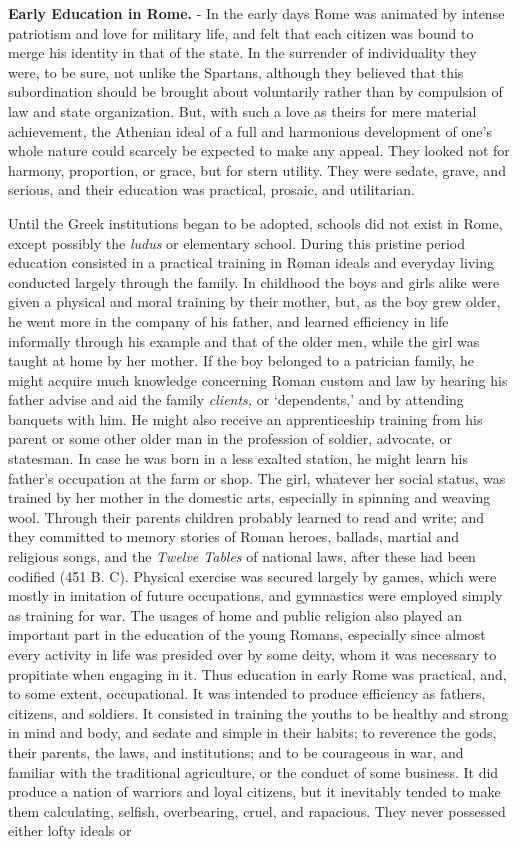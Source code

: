 \documentclass[]{book}
\begin{document}
\textbf{Early Education in Rome.} - In the early days Rome was animated by intense patriotism and love for military life, and felt that each citizen was bound to merge his identity in that of the state. In the surrender of individuality they were, to be sure, not unlike the Spartans, although they believed that this subordination should be brought about voluntarily rather than by compulsion of law and state organization. But, with such a love as theirs for mere material achievement, the Athenian ideal of a full and harmonious development of one's whole nature could scarcely be expected to make any appeal. They looked not for harmony, proportion, or grace, but for stern utility. They were sedate, grave, and serious, and their education was practical, prosaic, and utilitarian.

Until the Greek institutions began to be adopted, schools did not exist in Rome, except possibly the \emph{ludus} or elementary school. During this pristine period education consisted in a practical training in Roman ideals and everyday living conducted largely through the family. In childhood the boys and girls alike were given a physical and moral training by their mother, but, as the boy grew older, he went more in the company of his father, and learned efficiency in life informally through his example and that of the older men, while the girl was taught at home by her mother. If the boy belonged to a patrician family, he might acquire much knowledge concerning Roman custom and law by hearing his father advise and aid the family \emph{clients,} or `dependents,' and by attending banquets with him. He might also receive an apprenticeship training from his parent or some other older man in the profession of soldier, advocate, or statesman. In case he was born in a less exalted station, he might learn his father's occupation at the farm or shop. The girl, whatever her social status, was trained by her mother in the domestic arts, especially in spinning and weaving wool. Through their parents children probably learned to read and write; and they committed to memory stories of Roman heroes, ballads, martial and religious songs, and the \emph{Twelve Tables} of national laws, after these had been codified (451 B. C). Physical exercise was secured largely by games, which were mostly in imitation of future occupations, and gymnastics were employed simply as training for war. The usages of home and public religion also played an important part in the education of the young Romans, especially since almost every activity in life was presided over by some deity, whom it was necessary to propitiate when engaging in it. Thus education in early Rome was practical, and, to some extent, occupational. It was intended to produce efficiency as fathers, citizens, and soldiers. It consisted in training the youths to be healthy and strong in mind and body, and sedate and simple in their habits; to reverence the gods, their parents, the laws, and institutions; and to be courageous in war, and familiar with the traditional agriculture, or the conduct of some business. It did produce a nation of warriors and loyal citizens, but it inevitably tended to make them calculating, selfish, overbearing, cruel, and rapacious. They never possessed either lofty ideals or 
\end{document}
